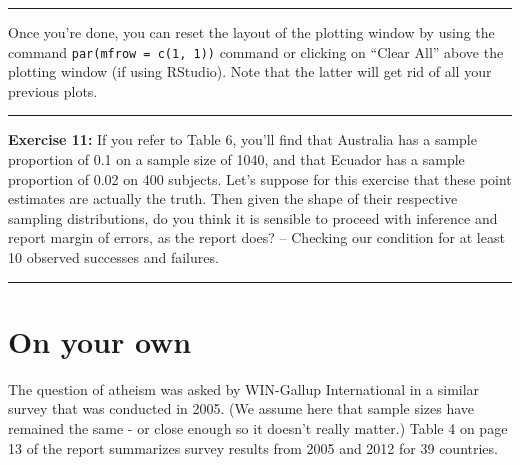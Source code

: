 \documentclass[]{book}
\theoremstyle{definition}
\theoremstyle{definition}
\theoremstyle{definition}
\theoremstyle{remark}
\begin{document}
\begin{center}\rule{0.5\linewidth}{\linethickness}\end{center}

Once you're done, you can reset the layout of the plotting window by
using the command \texttt{par(mfrow\ =\ c(1,\ 1))} command or clicking
on ``Clear All'' above the plotting window (if using RStudio). Note that
the latter will get rid of all your previous plots.

\begin{center}\rule{0.5\linewidth}{\linethickness}\end{center}

\textbf{Exercise 11:} If you refer to Table 6, you'll find that
Australia has a sample proportion of 0.1 on a sample size of 1040, and
that Ecuador has a sample proportion of 0.02 on 400 subjects. Let's
suppose for this exercise that these point estimates are actually the
truth. Then given the shape of their respective sampling distributions,
do you think it is sensible to proceed with inference and report margin
of errors, as the report does? -- Checking our condition for at least 10
observed successes and failures.

\begin{center}\rule{0.5\linewidth}{\linethickness}\end{center}

\hypertarget{on-your-own-6}{%
\section{On your own}\label{on-your-own-6}}

The question of atheism was asked by WIN-Gallup International in a
similar survey that was conducted in 2005. (We assume here that sample
sizes have remained the same - or close enough so it doesn't really
matter.) Table 4 on page 13 of the report summarizes survey results from
2005 and 2012 for 39 countries.
\end{document}
